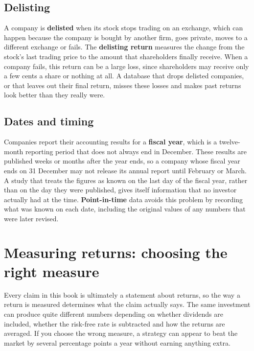 \subsection{Delisting}

A company is \textbf{delisted} when its stock stops trading on an exchange, which can happen because the company is bought by another firm, goes private, moves to a different exchange or fails. The \textbf{delisting return} measures the change from the stock's last trading price to the amount that shareholders finally receive. When a company fails, this return can be a large loss, since shareholders may receive only a few cents a share or nothing at all. A database that drops delisted companies, or that leaves out their final return, misses these losses and makes past returns look better than they really were.


\subsection{Dates and timing}

Companies report their accounting results for a \textbf{fiscal year}, which is a twelve-month reporting period that does not always end in December. These results are published weeks or months after the year ends, so a company whose fiscal year ends on 31 December may not release its annual report until February or March. A study that treats the figures as known on the last day of the fiscal year, rather than on the day they were published, gives itself information that no investor actually had at the time. \textbf{Point-in-time} data avoids this problem by recording what was known on each date, including the original values of any numbers that were later revised.

\section{Measuring returns: choosing the right measure}
\label{sec:02-returns}

Every claim in this book is ultimately a statement about returns, so the way a return is measured determines what the claim actually says. The same investment can produce quite different numbers depending on whether dividends are included, whether the risk-free rate is subtracted and how the returns are averaged. If you choose the wrong measure, a strategy can appear to beat the market by several percentage points a year without earning anything extra.


